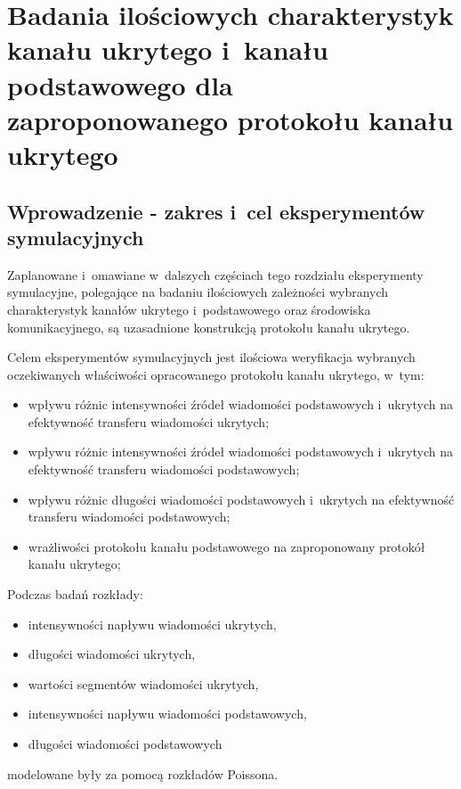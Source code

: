 \documentclass[a4paper, twoside, openright, 12pt]{report}
\begin{document}
\chapter{Badania ilościowych charakterystyk kanału ukrytego i~kanału podstawowego dla zaproponowanego protokołu kanału ukrytego}
    \section{Wprowadzenie - zakres i~cel eksperymentów symulacyjnych}
    Zaplanowane i~omawiane w~dalszych częściach tego rozdziału eksperymenty symulacyjne,
    polegające na badaniu ilościowych zależności wybranych charakterystyk kanałów
    ukrytego i~podstawowego oraz środowiska komunikacyjnego, są uzasadnione konstrukcją
    protokołu kanału ukrytego.

    Celem eksperymentów symulacyjnych jest ilościowa weryfikacja wybranych oczekiwanych właściwości
    opracowanego protokołu kanału ukrytego, w~tym:
    \begin{itemize} \itemsep1pt \parskip0pt 
        \item wpływu różnic intensywności źródeł wiadomości podstawowych i~ukrytych na
            efektywność transferu wiadomości ukrytych;
        \item wpływu różnic intensywności źródeł wiadomości podstawowych i~ukrytych na
            efektywność transferu wiadomości podstawowych;
        \item wpływu różnic długości wiadomości podstawowych i~ukrytych na efektywność
            transferu wiadomości podstawowych;
        \item wrażliwości protokołu kanału podstawowego na zaproponowany protokół
            kanału ukrytego;
    \end{itemize}

    Podczas badań rozkłady:
    \begin{itemize} \itemsep1pt \parskip0pt 
        \item intensywności napływu wiadomości ukrytych,
        \item długości wiadomości ukrytych,
        \item wartości segmentów wiadomości ukrytych,
        \item intensywności napływu wiadomości podstawowych,
        \item długości wiadomości podstawowych
    \end{itemize}
    modelowane były za pomocą rozkładów Poissona. \\
\end{document}
